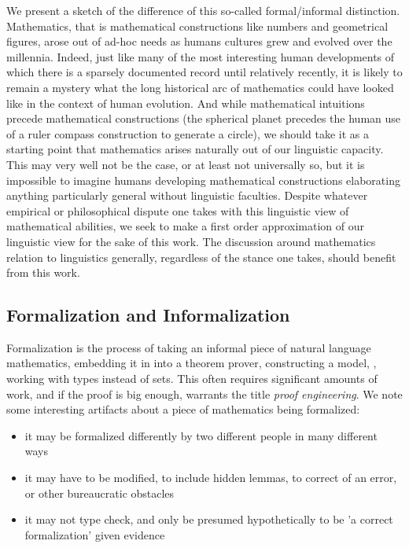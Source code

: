 We present a sketch of the difference of this so-called formal/informal
distinction. Mathematics, that is mathematical constructions like numbers and
geometrical figures, arose out of ad-hoc needs as humans cultures grew and
evolved over the millennia. Indeed, just like many of the most interesting human
developments of which there is a sparsely documented record until relatively
recently, it is likely to remain a mystery what the long historical arc of
mathematics could have looked like in the context of human evolution. And while
mathematical intuitions precede mathematical constructions (the spherical planet
precedes the human use of a ruler compass construction to generate a circle), we
should take it as a starting point that mathematics arises naturally out of our
linguistic capacity. This may very well not be the case, or at least not
universally so, but it is impossible to imagine humans developing mathematical
constructions elaborating anything particularly general without linguistic
faculties. Despite whatever empirical or philosophical dispute one takes with
this linguistic view of mathematical abilities, we seek to make a first order
approximation of our linguistic view for the sake of this work. The discussion around
mathematics relation to linguistics generally, regardless of the stance
one takes, should benefit from this work.

\subsection{Formalization and Informalization}

Formalization is the process of taking an informal piece of natural language
mathematics, embedding it in into a theorem prover, constructing a model, ,
working with types instead of sets. This often requires significant amounts of
work, and if the proof is big enough, warrants the title \emph{proof
engineering}. We note some interesting artifacts about a piece of mathematics
being formalized:

\begin{itemize}

\item it may be formalized differently by two different people in many different ways
\item it may have to be modified, to include hidden lemmas, to correct of an
  error, or other bureaucratic obstacles
\item it may not type check, and only be presumed hypothetically to be 'a
  correct formalization' given evidence 

\end{itemize}

